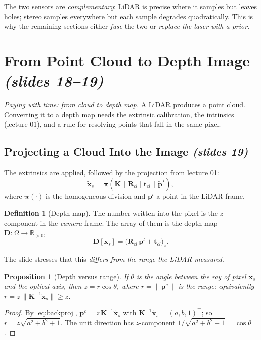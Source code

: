 \documentclass[11pt,a4paper]{article}
\numberwithin{equation}{section}
\newcommand{\slides}[1]{\texorpdfstring{\;\emph{(slides #1)}}{ (slides #1)}}
\newcommand{\R}{\mathbb{R}}
\newcommand{\xt}{\tilde{\mathbf{x}}}
\newcommand{\Kinv}{\bm K^{-1}}
\theoremstyle{plain}
\newtheorem{proposition}[theorem]{Proposition}
\theoremstyle{definition}
\newtheorem{definition}[theorem]{Definition}
\begin{document}
\begin{intuition}
The two sensors are \emph{complementary}: LiDAR is precise where it samples but leaves holes; stereo samples everywhere but each sample degrades quadratically. This is why the remaining sections either \emph{fuse} the two or \emph{replace the laser with a prior}.
\end{intuition}
 
\section{From Point Cloud to Depth Image \slides{18--19}}
\emph{Paying with time: from cloud to depth map.} A LiDAR produces a point cloud. Converting it to a depth map needs the extrinsic calibration, the intrinsics (lecture 01), and a rule for resolving points that fall in the same pixel.
 
\subsection{Projecting a Cloud Into the Image \slides{19}}
 
The extrinsics are applied, followed by the projection from lecture 01:
\begin{equation}\label{eq:lidarproj}
\xt_s=\bm\pi\!\left(\bm K\,[\,\bm R_{cl}\mid\bm t_{cl}\,]\,\tilde{\bm p}^{\,l}\right),
\end{equation}
where $\bm\pi(\cdot)$ is the homogeneous division and $\bm p^l$ a point in the LiDAR frame.
 
\begin{definition}[Depth map]
The number written into the pixel is the $z$ component in the \emph{camera} frame. The array of them is the depth map $\bm D:\Omega\to\R_{>0}$,
\[
\bm D[\bm x_s]=\big(\bm R_{cl}\,\bm p^{l}+\bm t_{cl}\big)_z .
\]
\end{definition}
 
The slide stresses that this \emph{differs from the range the LiDAR measured}.
 
\begin{proposition}[Depth versus range]\label{prop:rangez}
If $\theta$ is the angle between the ray of pixel $\bm x_s$ and the optical axis, then $z=r\cos\theta$, where $r=\|\bm p^c\|$ is the range; equivalently $r=z\,\|\Kinv\xt_s\|\ge z$.
\end{proposition}
\begin{proof}
By \eqref{eq:backproj}, $\bm p^c=z\,\Kinv\xt_s$ with $\Kinv\xt_s=(a,b,1)^\top$; so $r=z\sqrt{a^2+b^2+1}$. The unit direction has $z$-component $1/\sqrt{a^2+b^2+1}=\cos\theta$. \qedhere
\end{proof}
 
\end{document}
